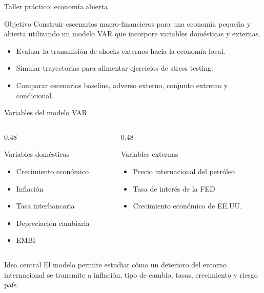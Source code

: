 \documentclass[10pt,aspectratio=169]{beamer}
\begin{document}
\begin{frame}{Taller práctico: economía abierta}

\begin{block}{Objetivo}
Construir escenarios macro-financieros para una economía pequeña y abierta utilizando un modelo VAR que incorpore variables domésticas y externas.
\end{block}

\begin{itemize}
    \item Evaluar la transmisión de shocks externos hacia la economía local.
    \item Simular trayectorias para alimentar ejercicios de stress testing.
    \item Comparar escenarios baseline, adverso externo, conjunto extremo y condicional.
\end{itemize}

\end{frame}

\begin{frame}{Variables del modelo VAR}

\begin{columns}[T]

\begin{column}{0.48\textwidth}
\begin{block}{Variables domésticas}
\small
\begin{itemize}
    \item Crecimiento económico
    \item Inflación
    \item Tasa interbancaria
    \item Depreciación cambiaria
    \item EMBI
\end{itemize}
\end{block}
\end{column}

\begin{column}{0.48\textwidth}
\begin{block}{Variables externas}
\small
\begin{itemize}
    \item Precio internacional del petróleo
    \item Tasa de interés de la FED
    \item Crecimiento económico de EE.UU.
\end{itemize}
\end{block}
\end{column}

\end{columns}

\vspace{0.5em}

\begin{alertblock}{Idea central}
El modelo permite estudiar cómo un deterioro del entorno internacional se transmite a inflación, tipo de cambio, tasas, crecimiento y riesgo país.
\end{alertblock}

\end{frame}
\end{document}
